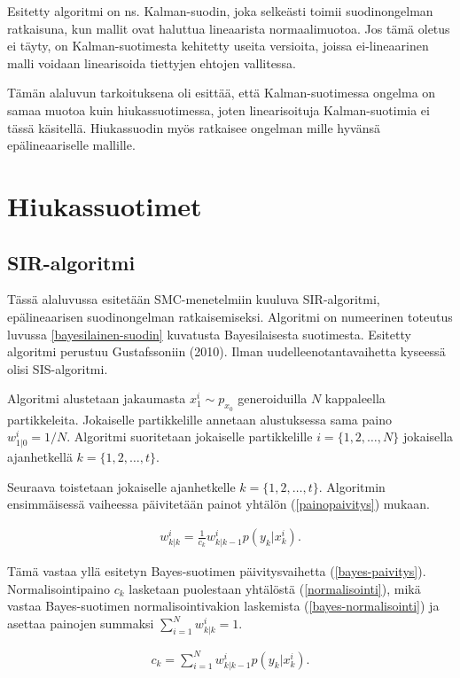 \documentclass[
  12pt,
  a4paper, twoside]{book}
\begin{document}
Esitetty algoritmi on ns. Kalman-suodin, joka selkeästi toimii suodinongelman ratkaisuna, kun mallit ovat haluttua lineaarista normaalimuotoa. Jos tämä oletus ei täyty, on Kalman-suotimesta kehitetty useita versioita, joissa ei-lineaarinen malli voidaan linearisoida tiettyjen ehtojen vallitessa.

Tämän alaluvun tarkoituksena oli esittää, että Kalman-suotimessa ongelma on samaa muotoa kuin hiukassuotimessa, joten linearisoituja Kalman-suotimia ei tässä käsitellä. Hiukassuodin myös ratkaisee ongelman mille hyvänsä epälineaariselle mallille.

\chapter{Hiukassuotimet} \label{hiukassuotimet}

\section{SIR-algoritmi}

Tässä alaluvussa esitetään SMC-menetelmiin kuuluva SIR-algoritmi, epälineaarisen suodinongelman ratkaisemiseksi. Algoritmi on numeerinen toteutus luvussa \ref{bayesilainen-suodin} kuvatusta Bayesilaisesta suotimesta. Esitetty algoritmi perustuu Gustafssoniin (2010). Ilman uudelleenotantavaihetta kyseessä olisi SIS-algoritmi.

Algoritmi alustetaan jakaumasta \(x_1^i\sim p_{x_0}\) generoiduilla \(N\) kappaleella partikkeleita. Jokaiselle partikkelille annetaan alustuksessa sama paino \(w_{1|0}^i=1/N\). Algoritmi suoritetaan jokaiselle partikkelille \(i=\{1,2,\ldots,N\}\) jokaisella ajanhetkellä \(k=\{1,2,\ldots,t\}\).

Seuraava toistetaan jokaiselle ajanhetkelle \(k=\{1,2,\ldots,t\}\). Algoritmin ensimmäisessä vaiheessa päivitetään painot yhtälön (\ref{painopaivitys}) mukaan.

\begin{align}\label{painopaivitys}
w^i_{k|k}=\frac{1}{c_k}w^i_{k|k-1}p(y_k|x^i_k).
\end{align}

\noindent Tämä vastaa yllä esitetyn Bayes-suotimen päivitysvaihetta (\ref{bayes-paivitys}). Normalisointipaino \(c_k\) lasketaan puolestaan yhtälöstä (\ref{normalisointi}), mikä vastaa Bayes-suotimen normalisointivakion laskemista (\ref{bayes-normalisointi}) ja asettaa painojen summaksi \(\sum_{i=1}^Nw^i_{k|k}=1\).

\begin{align}\label{normalisointi}
c_k=\sum_{i=1}^{N}w_{k|{k-1}}^ip(y_k|x_k^i).
\end{align}
\end{document}
